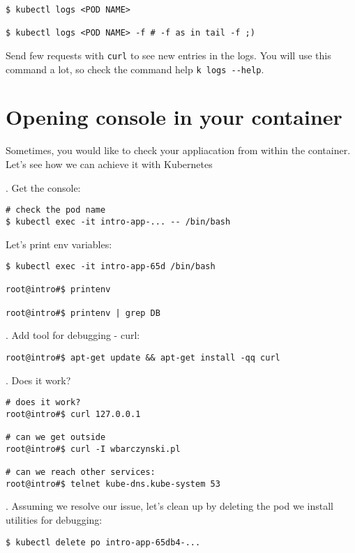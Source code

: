 \documentclass[12pt, letterpaper]{article}
\begin{document}
\begin{verbatim}
$ kubectl logs <POD NAME>

$ kubectl logs <POD NAME> -f # -f as in tail -f ;)
\end{verbatim}

Send few requests with \verb|curl| to see new entries in the logs. You will use this command a lot, so check the command help \verb|k logs --help|.

\pagebreak
\section{Opening console in your container}

Sometimes, you would like to check your appliacation from within the container. Let's see how we can achieve it with Kubernetes

. Get the console:

\begin{verbatim}
# check the pod name
$ kubectl exec -it intro-app-... -- /bin/bash
\end{verbatim}

Let's print env variables:

\begin{verbatim}
$ kubectl exec -it intro-app-65d /bin/bash

root@intro#$ printenv

root@intro#$ printenv | grep DB
\end{verbatim}

. Add tool for debugging - curl:

\begin{verbatim}
root@intro#$ apt-get update && apt-get install -qq curl
\end{verbatim}

. Does it work?

\begin{verbatim}
# does it work?
root@intro#$ curl 127.0.0.1

# can we get outside
root@intro#$ curl -I wbarczynski.pl

# can we reach other services:
root@intro#$ telnet kube-dns.kube-system 53
\end{verbatim}

. Assuming we resolve our issue, let's clean up by deleting the pod we install utilities for debugging:

\begin{verbatim}
$ kubectl delete po intro-app-65db4-...
\end{verbatim}
%
%
%
\pagebreak
\end{document}
